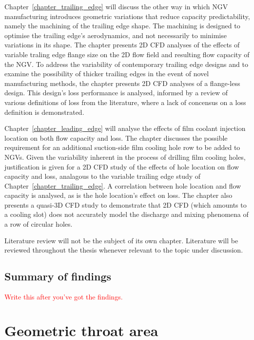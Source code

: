 \documentclass[a4paper, 11pt, oneside]{report}
\begin{document}
Chapter~\ref{chapter_trailing_edge} will discuss the other way in which NGV manufacturing introduces geometric variations that reduce capacity predictability, namely the machining of the trailing edge shape. The machining is designed to optimise the trailing edge's aerodynamics, and not necessarily to minimise variations in its shape. The chapter presents 2D CFD analyses of the effects of variable traling edge flange size on the 2D flow field and resulting flow capacity of the NGV. To address the variability of contemporary trailing edge designs and to examine the possibility of thicker trailing edges in the event of novel manufacturing methods, the chapter presents 2D CFD analyses of a flange-less design. This design's loss performance is analysed, informed by a review of various definitions of loss from the literature, where a lack of concensus on a loss definition is demonstrated.

Chapter~\ref{chapter_leading_edge} will analyse the effects of film coolant injection location on both flow capacity and loss. The chapter discusses the possible requirement for an additional suction-side film cooling hole row to be added to NGVs. Given the variability inherent in the process of drilling film cooling holes, justification is given for a 2D CFD study of the effects of hole location on flow capacity and loss, analagous to the variable trailing edge study of Chapter~\ref{chapter_trailing_edge}. A correlation between hole location and flow capacity is analysed, as is the hole location's effect on loss. The chapter also presents a quasi-3D CFD study to demonstrate that 2D CFD (which amounts to a cooling slot) does not accurately model the discharge and mixing phenomena of a row of circular holes.

Literature review will not be the subject of its own chapter. Literature will be reviewed throughout the thesis whenever relevant to the topic under discussion.

\section{Summary of findings}

\textcolor{red}{Write this after you've got the findings.}

\chapter{Geometric throat area}
\label{chapter_geometric_throat_area}
\end{document}
